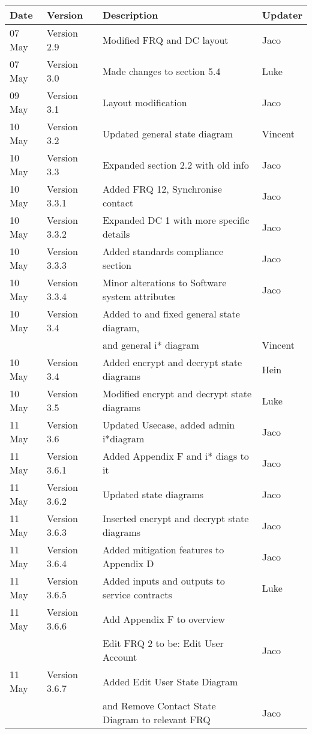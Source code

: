 \begin{center}
\begin{tabular}{|l|l|l|l|}
\hline
\textbf{Date} & \textbf{Version} & \textbf{Description}&\textbf{Updater}\\ 
\hline
07 May & Version 2.9 & Modified FRQ and DC layout & Jaco\\
\hline
07 May & Version 3.0 & Made changes to section 5.4 & Luke\\
\hline
09 May & Version 3.1 & Layout modification & Jaco\\
\hline
10 May & Version 3.2 & Updated general state diagram & Vincent\\
\hline
10 May & Version 3.3 & Expanded section 2.2 with old info& Jaco\\
\hline
10 May & Version 3.3.1 & Added FRQ 12, Synchronise contact& Jaco\\
\hline
10 May & Version 3.3.2 & Expanded DC 1 with more specific details& Jaco\\
\hline
10 May & Version 3.3.3 & Added standards compliance section& Jaco\\
\hline
10 May & Version 3.3.4 & Minor alterations to Software system attributes& Jaco\\
\hline
10 May & Version 3.4 & Added to and fixed general state diagram,&\\
&& and general i* diagram & Vincent\\
\hline
10 May & Version 3.4 & Added encrypt and decrypt state diagrams & Hein\\
\hline
10 May & Version 3.5 & Modified encrypt and decrypt state diagrams & Luke\\
\hline
11 May & Version 3.6 & Updated Usecase, added admin i*diagram& Jaco\\
\hline
11 May & Version 3.6.1 & Added Appendix F and i* diags to it &Jaco\\
\hline
11 May & Version 3.6.2 & Updated state diagrams &Jaco\\
\hline
11 May & Version 3.6.3 & Inserted encrypt and decrypt state diagrams&Jaco\\
\hline
11 May & Version 3.6.4 & Added mitigation features to Appendix D&Jaco\\
\hline
11 May & Version 3.6.5 & Added inputs and outputs to service contracts&Luke\\
\hline
11 May & Version 3.6.6 & Add Appendix F to overview&\\
 &  &Edit FRQ 2 to be:  Edit User Account &Jaco\\
\hline
11 May & Version 3.6.7 & Added Edit User State Diagram &\\
&&and Remove Contact State Diagram to relevant FRQ&Jaco\\
\hline
\end{tabular}


\end{center}
